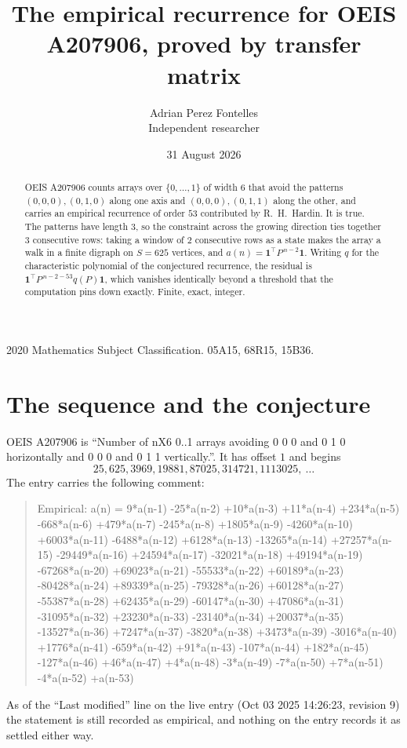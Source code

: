 \documentclass[11pt,a4paper]{article}
\title{The empirical recurrence for OEIS A207906, proved by transfer matrix}
\author{Adrian Perez Fontelles\\ \small Independent researcher}
\date{31 August 2026}
\theoremstyle{plain}
\theoremstyle{definition}
\begin{document}
\maketitle

\begin{abstract}
OEIS A207906 counts arrays over $\{0,\dots,1\}$ of width $6$ that avoid the patterns
$(0,0,0), (0,1,0)$ along one axis and $(0,0,0), (0,1,1)$ along the other, and carries an empirical recurrence of
order $53$ contributed by R.~H.~Hardin. It is true. The patterns have length $3$, so
the constraint across the growing direction ties together $3$ consecutive rows: taking a
window of $2$ consecutive rows as a state makes the array a walk in a finite digraph
on $S=625$ vertices, and $a(n)=\mathbf{1}^{\!\top}P^{\,n-2}\mathbf{1}$. Writing $q$
for the characteristic polynomial of the conjectured recurrence, the residual is
$\mathbf{1}^{\!\top}P^{\,n-2-53}q(P)\mathbf{1}$, which vanishes identically
beyond a threshold that the computation pins down exactly. Finite, exact, integer.
\end{abstract}

\noindent\small 2020 Mathematics Subject Classification. 05A15, 68R15, 15B36.\normalsize

\section{The sequence and the conjecture}

OEIS A207906 is ``Number of nX6 0..1 arrays avoiding 0 0 0 and 0 1 0 horizontally and 0 0 0 and 0 1 1 vertically.''. It has offset
$1$ and begins
\[
25, 625, 3969, 19881, 87025, 314721, 1113025,\ \dots
\]
The entry carries the following comment:
\begin{quote}\small
Empirical: a(n) = 9*a(n-1) -25*a(n-2) +10*a(n-3) +11*a(n-4) +234*a(n-5) -668*a(n-6) +479*a(n-7) -245*a(n-8) +1805*a(n-9) -4260*a(n-10) +6003*a(n-11) -6488*a(n-12) +6128*a(n-13) -13265*a(n-14) +27257*a(n-15) -29449*a(n-16) +24594*a(n-17) -32021*a(n-18) +49194*a(n-19) -67268*a(n-20) +69023*a(n-21) -55533*a(n-22) +60189*a(n-23) -80428*a(n-24) +89339*a(n-25) -79328*a(n-26) +60128*a(n-27) -55387*a(n-28) +62435*a(n-29) -60147*a(n-30) +47086*a(n-31) -31095*a(n-32) +23230*a(n-33) -23140*a(n-34) +20037*a(n-35) -13527*a(n-36) +7247*a(n-37) -3820*a(n-38) +3473*a(n-39) -3016*a(n-40) +1776*a(n-41) -659*a(n-42) +91*a(n-43) -107*a(n-44) +182*a(n-45) -127*a(n-46) +46*a(n-47) +4*a(n-48) -3*a(n-49) -7*a(n-50) +7*a(n-51) -4*a(n-52) +a(n-53)
\end{quote}
As of the ``Last modified'' line on the live entry (Oct 03 2025 14:26:23, revision
9) the statement is still recorded as empirical, and nothing on the entry
records it as settled either way.
\end{document}
